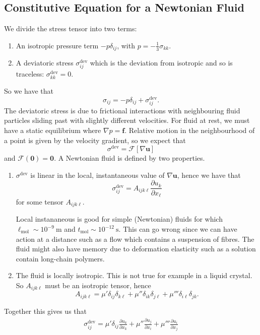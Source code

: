 \documentclass{article}
\newcommand{\dev}{\sigma^{\mathrm{dev}}}
\begin{document}
\subsection{Constitutive Equation for a Newtonian Fluid}
We divide the stress tensor into two terms:
\begin{enumerate}
	\item An isotropic pressure term $ -p\delta_{ij} $, with $ p = -\frac 13 \sigma_{kk} $.
	\item A deviatoric stress $ \sigma_{ij}^{\mathrm{dev}} $ which is the deviation from isotropic and so is traceless: $ \sigma_{kk}^{\mathrm{dev}} = 0 $.
\end{enumerate}
So we have that
\[
	\sigma_{ij} = -p\delta_{ij} + \sigma_{ij}^\mathrm{dev}.
\]
The deviatoric stress is due to frictional interactions with neighbouring fluid particles sliding past with slightly different velocities. For fluid at rest, we must have a static equilibrium where $ \nabla p = \mathbf f $. Relative motion in the neighbourhood of a point is given by the velocity gradient, so we expect that
\[
	\sigma^{\mathrm{dev}} = \mathcal F[\nabla \mathbf u]
\]
and $ \mathcal F(\mathbf 0) = \mathbf 0 $. A Newtonian fluid is defined by two properties.
\begin{enumerate}
	\item $ \dev $ is linear in the local, instantaneous value of $ \nabla \mathbf u $, hence we have that
		\[
			\dev_{ij} = A_{ijk\ell} \frac{\partial u_k}{\partial x_\ell}
		\]
		for some tensor $ A_{ijk\ell} $.\par
		Local instananeous is good for simple (Newtonian) fluids for which $ \ell_{\mathrm{mol}} \sim 10^{-9} \ \mathrm m$ and $ t_{\mathrm{mol}} \sim 10^{-12} \ \mathrm s $. This can go wrong since we can have action at a distance such as a flow which contains a suspension of fibres. The fluid might also have memory due to deformation elasticity such as a solution contain long-chain polymers.
	\item The fluid is locally isotropic. This is not true for example in a liquid crystal. So $ A_{ijk\ell} $ must be an isotropic tensor, hence
		\[
			A_{ijk\ell} = \mu' \delta_{ij}\delta_{k\ell} + \mu'' \delta_{ik}\delta_{j\ell} + \mu'''\delta_{i\ell}\delta_{jk}.
		\]
\end{enumerate}
Together this gives us that
\begin{align*}
	\dev_{ij} = \mu'\delta_{ij}\frac{\partial u_k}{\partial x_k} + \mu'' \frac{\partial u_j}{\partial x_i} + \mu''' \frac{\partial u_i}{\partial x_j}
\end{align*}
\end{document}
